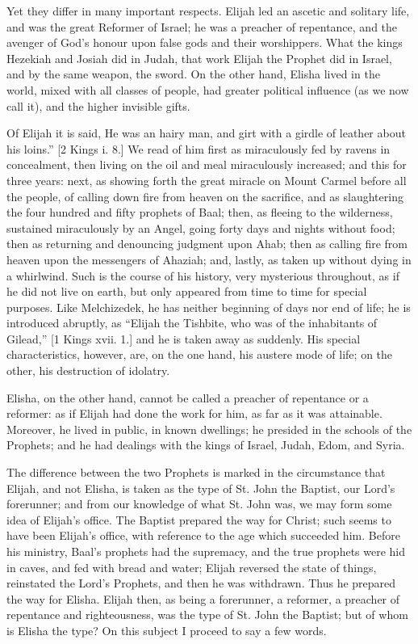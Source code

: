 Yet they differ in many important respects. Elijah led an ascetic
and solitary life, and was the great Reformer of Israel; he was a
preacher of repentance, and the avenger of God's honour upon false
gods and their worshippers. What the kings Hezekiah and Josiah did in
Judah, that work Elijah the Prophet did in Israel, and by the same
weapon, the sword. On the other hand, Elisha lived in the world, mixed
with all classes of people, had greater political influence (as we now
call it), and the higher invisible gifts.

Of Elijah it is said, He was an hairy man, and girt with a girdle
of leather about his loins.'' [2 Kings i. 8.] We read of him
first as miraculously fed by ravens in concealment, then living on the
oil and meal miraculously increased; and this for three years: next,
as showing forth the great miracle on Mount Carmel before all the
people, of calling down fire from heaven on the sacrifice, and as
slaughtering the four hundred and fifty prophets of Baal; then, as
fleeing to the wilderness, sustained miraculously by an Angel, going
forty days and nights without food; then as returning and denouncing
judgment upon Ahab; then as calling fire from heaven upon the
messengers of Ahaziah; and, lastly, as taken up without dying in a
whirlwind. Such is the course of his history, very mysterious
throughout, as if he did not live on earth, but only appeared from
time to time for special purposes. Like Melchizedek, he has neither
beginning of days nor end of life; he is introduced abruptly, as
``Elijah the Tishbite, who was of the inhabitants of Gilead,''
[1 Kings xvii. 1.] and he is taken away as suddenly. His special
characteristics, however, are, on the one hand, his austere mode of
life; on the other, his destruction of idolatry.

Elisha, on the other hand, cannot be called a preacher of
repentance or a reformer: as if Elijah had done the work for him, as
far as it was attainable. Moreover, he lived in public, in known
dwellings; he presided in the schools of the Prophets; and he had
dealings with the kings of Israel, Judah, Edom, and Syria.

The difference between the two Prophets is marked in the
circumstance that Elijah, and not Elisha, is taken as the type of St.
John the Baptist, our Lord's forerunner; and from our knowledge of
what St. John was, we may form some idea of Elijah's office. The
Baptist prepared the way for Christ; such seems to have been Elijah's
office, with reference to the age which succeeded him. Before his
ministry, Baal's prophets had the supremacy, and the true prophets
were hid in caves, and fed with bread and water; Elijah reversed the
state of things, reinstated the Lord's Prophets, and then he was
withdrawn. Thus he prepared the way for Elisha. Elijah then, as being
a forerunner, a reformer, a preacher of repentance and righteousness,
was the type of St. John the Baptist; but of whom is Elisha the type?
On this subject I proceed to say a few words.

